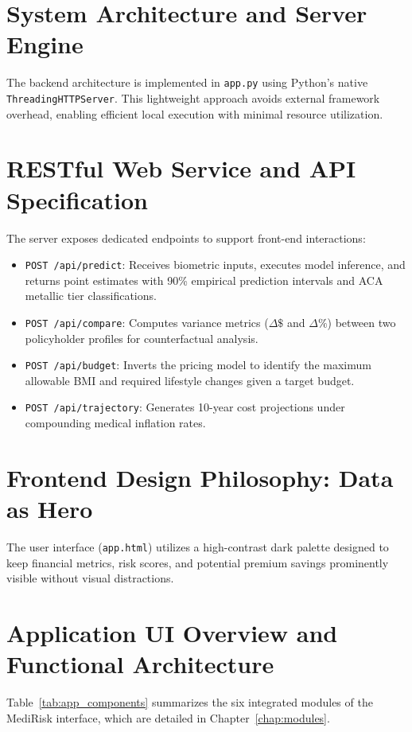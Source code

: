 \documentclass[12pt,a4paper]{report}
\begin{document}
\section{System Architecture and Server Engine}
The backend architecture is implemented in \texttt{app.py} using Python's native \texttt{ThreadingHTTPServer}. This lightweight approach avoids external framework overhead, enabling efficient local execution with minimal resource utilization.

\section{RESTful Web Service and API Specification}
The server exposes dedicated endpoints to support front-end interactions:
\begin{itemize}
    \item \texttt{POST /api/predict}: Receives biometric inputs, executes model inference, and returns point estimates with 90\% empirical prediction intervals and ACA metallic tier classifications.
    \item \texttt{POST /api/compare}: Computes variance metrics ($\Delta\$$ and $\Delta\%$) between two policyholder profiles for counterfactual analysis.
    \item \texttt{POST /api/budget}: Inverts the pricing model to identify the maximum allowable BMI and required lifestyle changes given a target budget.
    \item \texttt{POST /api/trajectory}: Generates 10-year cost projections under compounding medical inflation rates.
\end{itemize}

\section{Frontend Design Philosophy: Data as Hero}
The user interface (\texttt{app.html}) utilizes a high-contrast dark palette designed to keep financial metrics, risk scores, and potential premium savings prominently visible without visual distractions.

\section{Application UI Overview and Functional Architecture}
Table~\ref{tab:app_components} summarizes the six integrated modules of the MediRisk interface, which are detailed in Chapter~\ref{chap:modules}.
\end{document}
